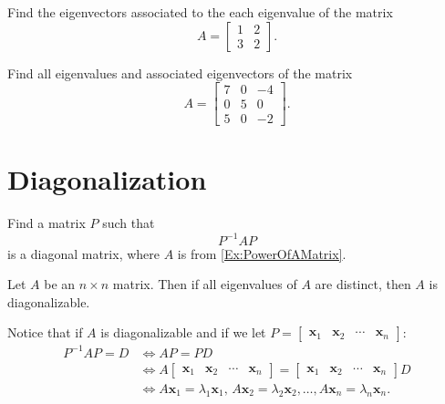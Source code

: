 \documentclass[20pt,a4paper]{extarticle}
\newcounter{example}
\newcounter{theorem}
\begin{document}
\begin{example}
Find the eigenvectors associated to the each eigenvalue of the matrix
	\[
		A = \begin{bmatrix}
		1 & 2 \\ 3 & 2 
		\end{bmatrix} .
	\]
\end{example}

\newpage 

\begin{example}
Find all eigenvalues and associated eigenvectors of the matrix
	\[
		A = \begin{bmatrix}
			7 & 0 & -4 \\ 
			0 & 5 & 0 \\ 
			5 & 0 & -2 
			\end{bmatrix} .
	\]
\end{example}

\begin{solution}

\end{solution}

\newpage 

\phantom{2}

\newpage

\section{Diagonalization}

\begin{example}
Find a matrix $P$ such that
	\[
		P^{-1} A P
	\]
is a diagonal matrix, where $A$ is from \cref{Ex:PowerOfAMatrix}.
\end{example}

\begin{solution}

\end{solution}

\newpage 

\begin{theorem}
Let $A$ be an $n \times n$ matrix. Then if all eigenvalues of $A$ are distinct, then $A$ is diagonalizable.
\end{theorem}

Notice that if $A$ is diagonalizable and if we let $P = \begin{bmatrix} \mathbf{x}_1 & \mathbf{x}_2 & \cdots & \mathbf{x}_n \end{bmatrix}$:
	\begin{align*}
		P^{-1} A P = D & \iff AP = PD \\
		&\iff A \begin{bmatrix} \mathbf{x}_1 & \mathbf{x}_2 & \cdots & \mathbf{x}_n \end{bmatrix} = \begin{bmatrix} \mathbf{x}_1 & \mathbf{x}_2 & \cdots & \mathbf{x}_n \end{bmatrix} D \\ 
		& \iff A \mathbf{x}_1 = \lambda_1 \mathbf{x}_1 , \, A \mathbf{x}_2 = \lambda_2 \mathbf{x}_2 , \ldots , A \mathbf{x}_n = \lambda_n \mathbf{x}_n .
	\end{align*}
\end{document}

